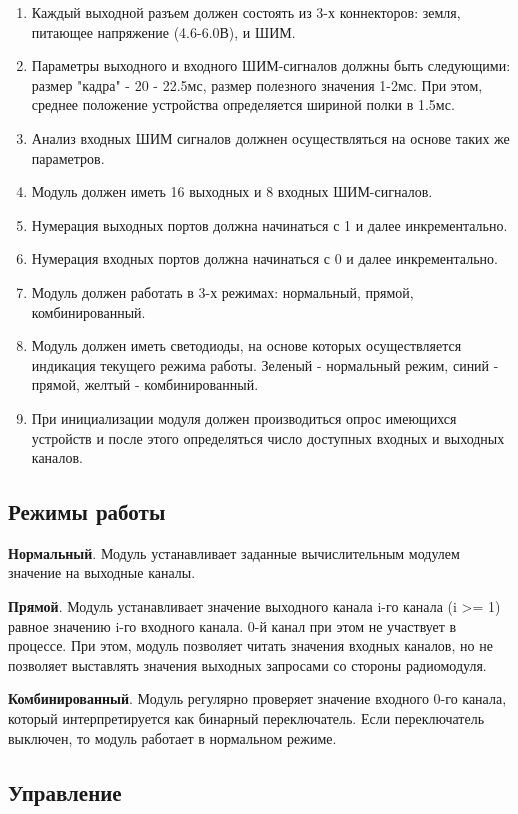 \documentclass[utf8]{report}
\begin{document}
\begin{enumerate}
  \item Каждый выходной разъем должен состоять из 3-х коннекторов: земля, питающее напряжение (4.6-6.0В), и ШИМ.
  \item Параметры выходного и входного ШИМ-сигналов должны быть следующими: размер "кадра" - 20 - 22.5мс, размер полезного значения 1-2мс. При этом, среднее положение устройства определяется шириной полки в 1.5мс.
  \item Анализ входных ШИМ сигналов должнен осуществляться на основе таких же параметров.
  \item Модуль должен иметь 16 выходных и 8 входных ШИМ-сигналов.
  \item Нумерация выходных портов должна начинаться с 1 и далее инкрементально.
  \item Нумерация входных портов должна начинаться с 0 и далее инкрементально.
  \item Модуль должен работать в 3-х режимах: нормальный, прямой, комбинированный.
  \item Модуль должен иметь светодиоды, на основе которых осуществляется индикация текущего режима работы. Зеленый - нормальный режим, синий - прямой, желтый - комбинированный.
  \item При инициализации модуля должен производиться опрос имеющихся устройств и после этого определяться число доступных входных и выходных каналов.
\end{enumerate}

\subsection{Режимы работы}

\textbf{Нормальный}. Модуль устанавливает заданные вычислительным модулем значение на выходные каналы.

\textbf{Прямой}. Модуль устанавливает значение выходного канала i-го канала (i >= 1) равное значению i-го входного канала. 0-й канал при этом не участвует в процессе. При этом, модуль позволяет читать значения входных каналов, но не позволяет выставлять значения выходных запросами со стороны радиомодуля.

\textbf{Комбинированный}. Модуль регулярно проверяет значение входного 0-го канала, который интерпретируется как бинарный переключатель. Если переключатель выключен, то модуль работает в нормальном режиме. 

\subsection{Управление}
\end{document}
